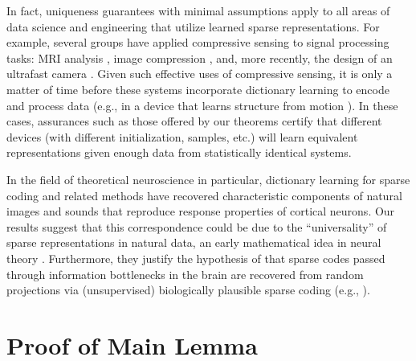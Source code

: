 \documentclass[9pt,twocolumn]{pnas-new}
\begin{document}
In fact, uniqueness guarantees with minimal assumptions apply to all areas of data science and engineering that utilize learned sparse representations. For example, several groups have applied compressive sensing to signal processing tasks: MRI analysis \cite{lustig2008compressed}, image compression \cite{Duarte08}, and, more recently, the design of an ultrafast camera \cite{Gao14}. Given such effective uses of compressive sensing, it is only a matter of time before these systems incorporate dictionary learning to encode and process data (e.g., in a device that learns structure from motion \cite{kong2016prior}). In these cases, assurances such as those offered by our theorems certify that different devices (with different initialization, samples, etc.) will learn equivalent representations given enough data from statistically identical systems.
%  

In the field of theoretical neuroscience in particular, dictionary learning for sparse coding and related methods have recovered characteristic components of natural images \cite{Olshausen96, hurri1996image, bell1997independent, van1998independent} and sounds \cite{bellsejnowski1996, smithlewicki2006, Carlson12} that reproduce response properties of cortical neurons. Our results suggest that this correspondence could be due to the ``universality'' of sparse representations in natural data, an early mathematical idea in neural theory \cite{pitts1947}. Furthermore, they justify the hypothesis of \cite{Coulter10, Isely10} that sparse codes passed through information bottlenecks in the brain are recovered from random projections via (unsupervised) biologically plausible sparse coding (e.g., \cite{rehnsommer2007, rozell2007neurally, hu2014hebbian}).


 \showacknow %



\clearpage

\section{Proof of Main Lemma}
\end{document}
